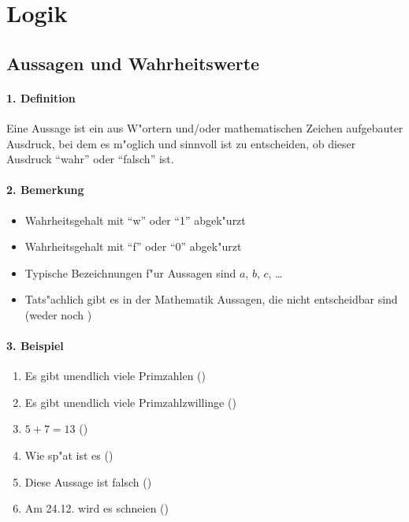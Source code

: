 \section{Logik}
\subsection{Aussagen und Wahrheitswerte}

\paragraph{1. Definition} \parskp
Eine Aussage ist ein aus W"ortern und/oder mathematischen Zeichen aufgebauter Ausdruck, bei dem es m"oglich und sinnvoll ist zu entscheiden, ob dieser Ausdruck \enquote{wahr} oder \enquote{falsch} ist.

\paragraph{2. Bemerkung}
\begin{itemize}
	\item Wahrheitsgehalt \true mit \enquote w oder \enquote 1 abgek"urzt
	\item Wahrheitsgehalt \false mit \enquote f oder \enquote 0 abgek"urzt
	\item Typische Bezeichnungen f"ur Aussagen sind $a$, $b$, $c$, \dots
	\item Tats"achlich gibt es in der Mathematik Aussagen, die nicht entscheidbar sind (weder \true noch \false)
\end{itemize}

\paragraph{3. Beispiel}
\begin{enumerate}
	\item Es gibt unendlich viele Primzahlen (\tgreen{\true})
	\item Es gibt unendlich viele Primzahlzwillinge ()
	\item $5+7=13$ (\tred{\false})
	\item Wie sp"at ist es ()
	\item Diese Aussage ist falsch ()
	\item Am 24.12. wird es schneien ()
\end{enumerate}

